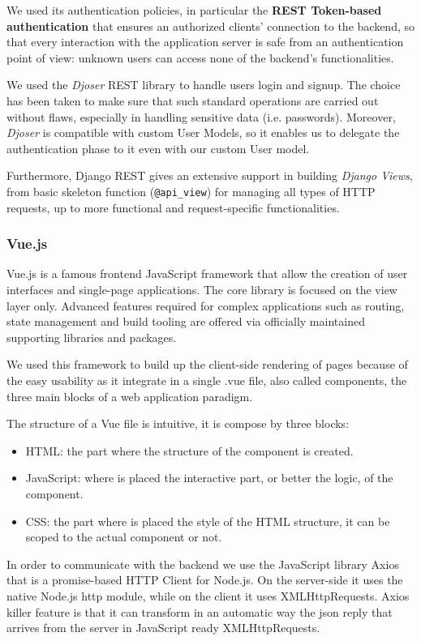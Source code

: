 \documentclass[table, 12pt]{article}
\begin{document}
We used its authentication policies, in particular the \textbf{REST Token-based authentication} that ensures an authorized clients' connection to the backend, so that every interaction with the application server is safe from an authentication point of view: unknown users can access none of the backend's functionalities.

We used the \emph{Djoser} REST library to handle users login and signup. The choice has been taken to make sure that such standard operations are carried out without flaws, especially in handling sensitive data (i.e. passwords). Moreover, \emph{Djoser} is compatible with custom User Models, so it enables us to delegate the authentication phase to it even with our custom User model.

Furthermore, Django REST gives an extensive support in building \emph{Django Views}, from basic skeleton function (\texttt{@api\_view}) for managing all types of HTTP requests, up to more functional and request-specific functionalities.

\subsubsection{Vue.js}
\label{Vue}
Vue.js is a famous frontend JavaScript framework that allow the creation of user interfaces and single-page applications.
The core library is focused on the view layer only.
Advanced features required for complex applications such as routing, state management and build tooling are offered via officially maintained supporting libraries and packages.

We used this framework to build up the client-side rendering of pages because of the easy usability as it integrate in a single .vue file, also called components,
the three main blocks of a web application paradigm.

The structure of a Vue file is intuitive, it is compose by three blocks:
\begin{itemize}
    \item HTML: the part where the structure of the component is created.
    \item JavaScript: where is placed the interactive part, or better the logic, of the component.
    \item CSS: the part where is placed the style of the HTML structure, it can be scoped to the actual component or not.
\end{itemize}
In order to communicate with the backend we use the JavaScript library Axios that is a promise-based HTTP Client for Node.js.
On the server-side it uses the native Node.js http module, while on the client it uses XMLHttpRequests.
Axios killer feature is that it can transform in an automatic way the json reply that arrives from the server in JavaScript ready XMLHttpRequests.
\end{document}

